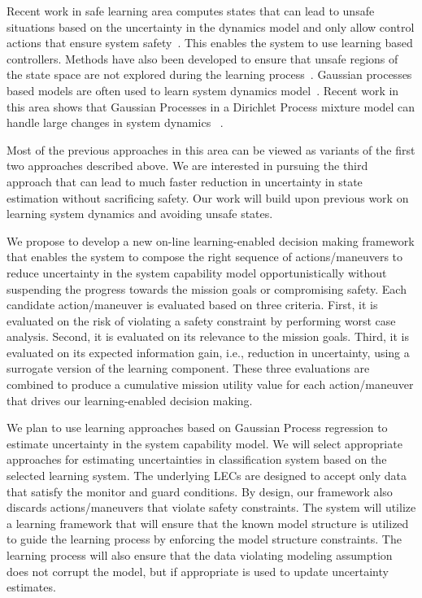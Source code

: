 Recent work in safe learning area computes states that can lead to unsafe situations based on the uncertainty in the dynamics model and only allow control actions that ensure system safety~\cite{Gillula2012,Gillulay2011,Roy2013}. This enables the system to use learning based controllers. Methods have also been developed to ensure that unsafe regions of the state space are not explored during the learning process~\cite{Polo2011,Martinez2015,Mannucci2017}. Gaussian processes based models are often used to learn system dynamics model~\cite{Akametalu2014,Berkenkamp2015,Berkenkamp2016}. Recent work in this area shows that Gaussian Processes in a Dirichlet Process mixture model can handle large changes in system dynamics ~\cite{McKinnon2017}.  

Most of the previous approaches in this area can be viewed as variants of the first two approaches described above. We are interested in pursuing the third approach that can lead to much faster reduction in uncertainty in state estimation without sacrificing safety. Our work will build upon previous work on learning system dynamics and avoiding unsafe states.       

We propose to develop a new on-line learning-enabled decision making framework that enables the system to compose the right sequence of actions/maneuvers to reduce uncertainty in the system capability model opportunistically without suspending the progress towards the mission goals or compromising safety.  Each candidate action/maneuver is evaluated based on three criteria. First, it is evaluated on the risk of violating a safety constraint by performing worst case analysis. Second, it is evaluated on its relevance to the mission goals. Third, it is evaluated on its expected information gain, i.e., reduction in uncertainty, using a surrogate version of the learning component. These three evaluations are combined to produce a cumulative mission utility value for each action/maneuver that drives our learning-enabled decision making. 

We plan to use learning approaches based on Gaussian Process regression to estimate uncertainty in the system capability model. We will select appropriate approaches for estimating uncertainties in classification system based on the selected learning system. The underlying LECs are designed to accept only data that satisfy the monitor and guard conditions. By design, our framework also discards actions/maneuvers that violate safety constraints. The system will utilize a learning framework that will ensure that the known model structure is utilized to guide the learning process by enforcing the model structure constraints. The learning process will also ensure that the data violating modeling assumption does not corrupt the model, but if appropriate is used to update uncertainty estimates.     

